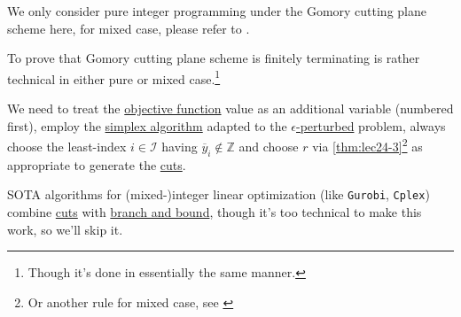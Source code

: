\begin{remark}
	We only consider pure integer programming under the Gomory cutting plane scheme here, for mixed case, please refer to \cite{Linear-Opt}.
\end{remark}

\begin{remark}
	To prove that Gomory cutting plane scheme is finitely terminating is rather technical in either pure or mixed
	case.\footnote{Though it's done in essentially the same manner.}

	We need to treat the \hyperref[def:objective-function]{objective function} value as an additional variable
	(numbered first), employ the \hyperref[algo:simplex-algorithm]{simplex algorithm} adapted to the
	\hyperref[def:perturbed-problem]{\(\epsilon \)-perturbed} problem, always choose the least-index \(i\in \mathcal{I} \)
	having \(\overline{y} _i \notin \mathbb{Z} \) and choose \(r\) via \autoref{thm:lec24-3}\footnote{Or another rule for mixed case, see \cite{Linear-Opt}}
	as appropriate to generate the \hyperref[def:Chvatal-Gomory-cut]{cuts}.
\end{remark}

\begin{remark}
	SOTA algorithms for (mixed-)integer linear optimization (like \texttt{Gurobi}, \texttt{Cplex}) combine \hyperref[def:Chvatal-Gomory-cut]{cuts} with
	\hyperref[algo:branch-and-bound-algorithm]{branch and bound}, though it's too technical to make this work, so we'll skip it.
\end{remark}